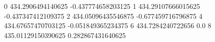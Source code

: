 0 434.2906494140625 -0.437774658203125
1 434.29107666015625 -0.437347412109375
2 434.05096435546875 -0.677459716796875
4 434.67657470703125 -0.051849365234375
6 434.7284240722656 0.0
8 435.01129150390625 0.282867431640625
